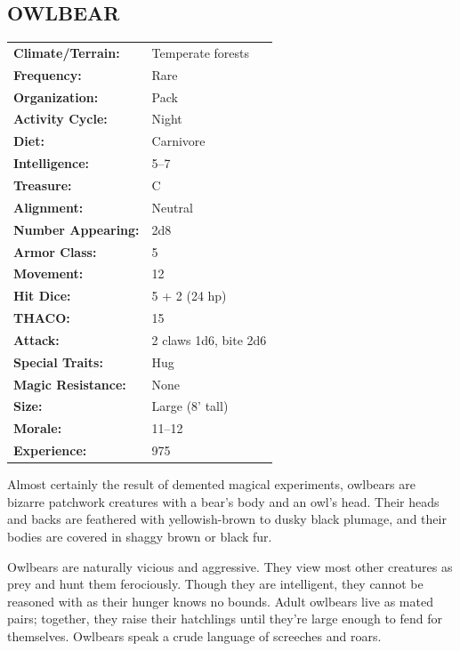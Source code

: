 \begin{multicols}{2}
\begin{minipage}{\columnwidth}
\subsection{OWLBEAR}

\noindent \begin{tabular}{p{}p{}}
\textbf{Climate/Terrain:}	& Temperate forests	\\
\textbf{Frequency:} 		& Rare	\\
\textbf{Organization:} 		& Pack	\\
\textbf{Activity Cycle:} 	& Night	\\
\textbf{Diet:} 				& Carnivore	\\
\textbf{Intelligence:} 		& 5--7	\\
\textbf{Treasure:} 			& C	\\
\textbf{Alignment:} 		& Neutral	\\
\hline
\textbf{Number Appearing:} 	& 2d8	\\
\textbf{Armor Class:} 		& 5	\\
\textbf{Movement:} 			& 12	\\
\textbf{Hit Dice:} 			& 5 + 2 (24 hp)	\\
\textbf{THACO:} 			& 15	\\
\textbf{Attack:} 			& 2 claws 1d6, bite 2d6	\\
\textbf{Special Traits:} & Hug	\\
\textbf{Magic Resistance:} 	& None	\\
\textbf{Size:} 				& Large (8' tall)	\\
\textbf{Morale:} 			& 11--12	\\
\textbf{Experience:} 		& 975	\\ %
\end{tabular}

\end{minipage}

Almost certainly the result of demented magical experiments, owlbears are bizarre patchwork creatures with a bear's body and an owl's head. Their heads and backs are feathered with yellowish-brown to dusky black plumage, and their bodies are covered in shaggy brown or black fur.

Owlbears are naturally vicious and aggressive. They view most other creatures as prey and hunt them ferociously. Though they are intelligent, they cannot be reasoned with as their hunger knows no bounds. Adult owlbears live as mated pairs; together, they raise their hatchlings until they're large enough to fend for themselves. Owlbears speak a crude language of screeches and roars.


\end{multicols}
